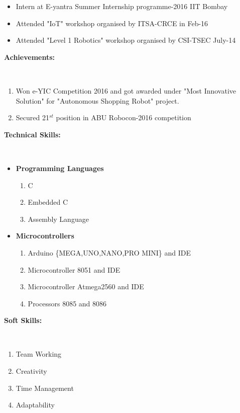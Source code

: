 \documentclass[a4paper]{article}
\begin{document}
\begin{flushleft}
\begin{itemize}
	  		\item Intern at E-yantra Summer Internship programme-2016 IIT Bombay
			\item Attended "IoT" workshop organised by ITSA-CRCE in Feb-16
			\item Attended "Level 1 Robotics" workshop organised by CSI-TSEC July-14
		\end{itemize}
		
			\begin{Large}\vspace{0.1in}\textbf{Achievements:}\end{Large}\\
				\begin{enumerate}
					\item Won e-YIC Competition 2016 and got awarded under "Most Innovative Solution" for "Autonomous Shopping Robot" project.
					\item Secured 21$^{st}$ position in ABU Robocon-2016 competition
				\end{enumerate}
			
			\begin{Large}\vspace{0.2in}\textbf{Technical Skills:}\end{Large}\\
			\begin{itemize}
				\item \large\textbf{Programming Languages}
					\begin{enumerate}
						\item C
						\item Embedded C
						\item Assembly Language
					\end{enumerate}
					\item \large\textbf{Microcontrollers}
						\begin{enumerate}
							\item Arduino \{MEGA,UNO,NANO,PRO MINI\} and IDE
							\item Microcontroller 8051 and IDE
							\item Microcontroller Atmega2560 and IDE
							\item Processors 8085 and 8086
						\end{enumerate}
			\end{itemize}
			
			\begin{Large}\vspace{0.1in}\textbf{Soft Skills:}\end{Large}\\
			\begin{enumerate}
				\item Team Working
				\item Creativity
				\item Time Management
				\item Adaptability
			\end{enumerate}
			

\end{flushleft}
\end{document}
